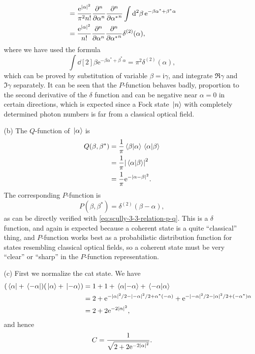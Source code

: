 \documentclass[hyperref, a4paper]{article}
\newcommand*{\ii}{\mathrm{i}}
\newcommand*{\ee}{\mathrm{e}}
\begin{document}
\begin{itemize}
\[\begin{aligned}
            &= \frac{\ee^{\left| \alpha \right|^{2}}}{\pi^{2} n !} \pdv[n]{\alpha} \pdv[n]{{\alpha^*}}  \int \dd[2]{\beta} \ee^{-\beta \alpha^{*}+\beta^{*} \alpha} \\
            &= \frac{\ee^{\left| \alpha \right|^{2}}}{ n !} \pdv[n]{\alpha} \pdv[n]{{\alpha^*}}  \delta^{(2)}(\alpha)  , 
        \end{aligned}
    \]
    where we have used the formula 
    \begin{equation}
        \int \dd[2]{\beta} \ee^{-\beta \alpha^* + \beta^* \alpha} = \pi^2 \delta^{(2)}(\alpha),
        \label{eq:integral-formula-1}
    \end{equation}
    which can be proved by substitution of variable $\beta = \ii \gamma$, and integrate $\Re \gamma$ and $\Im \gamma$ separately.
    It can be seen that the $P$-function behaves badly, proportion to the second derivative of the $\delta$ function and can be negative near $\alpha=0$ in certain directions, which is expected since a Fock state $\ket*{n}$ with completely determined photon numbers is far from a classical optical field.
    \item[(b)] The $Q$-function of $\ket*{\alpha}$ is
    \[
        \begin{aligned}
            Q(\beta, \beta^*) &= \frac{1}{\pi} \braket*{\beta}{\alpha} \braket*{\alpha}{\beta} \\
            &= \frac{1}{\pi} \abs{\braket*{\alpha}{\beta}}^2 \\
            &= \frac{1}{\pi} \ee^{- \abs{\alpha - \beta}^2}.
        \end{aligned}
    \] 
    The corresponding $P$-function is 
    \[
        P(\beta, \beta^*) = \delta^{(2)}(\beta - \alpha),
    \]
    as can be directly verified with \eqref{eq:scully-3-3-relation-p-q}.
    This is a $\delta$ function, and again is expected because a coherent state is a quite ``classical'' thing, and $P$-function works best as a probabilistic distribution function for states resembling classical optical fields, so a coherent state must be very ``clear'' or ``sharp'' in the $P$-function representation.
    \item[(c)] First we normalize the cat state. We have
    \[
        \begin{aligned}
            (\bra*{\alpha} + \bra*{-\alpha}) (\ket*{\alpha} + \ket*{-\alpha}) &= 1 + 1 + \braket*{\alpha}{ - \alpha} + \braket*{-\alpha}{\alpha} \\
            &= 2 + \ee^{- \abs{\alpha}^2/2 - \abs{-\alpha}^2/2 + \alpha^* (-\alpha)} + \ee^{- \abs{-\alpha}^2 / 2 - \abs{\alpha}^2/2 + (- \alpha^*) \alpha} \\
            &= 2 + 2 \ee^{-2 \abs{\alpha}^2},
        \end{aligned}
    \] 
    and hence 
    \begin{equation}
        C = \frac{1}{\sqrt{2 + 2 \ee^{-2 \abs{\alpha}^2}}}.
    \end{equation}


\end{itemize}
\end{document}
